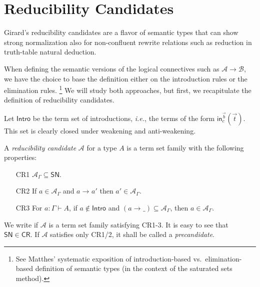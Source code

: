 \documentclass[a4paper,USenglish,cleveref, autoref, thm-restate]{lipics-v2021}
\makeatletter
\def\namedlabel#1#2{\begingroup
    #2%
    \def\@currentlabel{#2}%
    \phantomsection\label{#1}\endgroup
}
\newcommand{\ie}{\emph{i.e.}\xspace}
\newcommand{\tin}{\ensuremath{\mathsf{in}}}
\newcommand{\red}[1][]{\longrightarrow_{#1}}
\newcommand{\CR}{\mathsf{CR}}
\newcommand{\A}{\mathcal{A}}
\newcommand{\B}{\mathcal{B}}
\newcommand{\SN}{\mathsf{SN}}
\newcommand{\Intro}{\mathsf{Intro}}
\newcommand{\indy}[1]{_{#1}}
\makeatother
\begin{document}
\section{Reducibility Candidates}
\label{sec:cr}

Girard's reducibility candidates are a flavor of semantic types that
can show strong normalization also for non-confluent rewrite relations
such as reduction in truth-table natural deduction.

When defining the semantic versions of the logical connectives such as
$\A \to \B$, we have the choice to base the definition either on the
introduction rules or the elimination rules.%
\footnote{See Matthes' \cite[Section 6.2]{matthes:intersection}
  systematic exposition of introduction-based vs.\ elimination-based
  definition of semantic types (in the context of the saturated sets method).}
We will study both
approaches, but first, we recapitulate the definition of reducibility
candidates.

Let $\Intro$ be the term set of introductions, \ie, the terms of
the form $\tin^{\vec b}_c(\vec t)$.  This set is clearly closed under
weakening and anti-weakening.

A \emph{reducibility candidate} $\A$ for a type $A$
is a term set family
with the following properties:
\begin{itemize}%
\setlength{\itemindent}{2.7em}


\item[\namedlabel{it:cr1}{CR1}]
  $\A\indy\Gamma \subseteq \SN$.

\item[\namedlabel{it:cr2}{CR2}]
  If $a \in \A\indy\Gamma$ and $a \red a'$ then $a' \in \A\indy\Gamma$.

\item[\namedlabel{it:cr3}{CR3}]
  For $a : \Gamma \vdash A$,
  if $a \not\in \Intro$
  and $(a \red \_) \subseteq \A\indy\Gamma$, then $a \in \A\indy\Gamma$.

\end{itemize}
We write \fbox{$\A \in \CR$} if $\A$ is a term set family satisfying CR1-3.
It is easy to see that $\SN \in \CR$.
If $\A$ satisfies only CR1/2, it shall be called a \emph{precandidate}.
\end{document}
